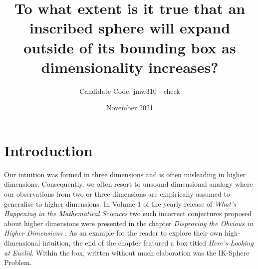 \title{To what extent is it true that an inscribed sphere will expand outside of its bounding box as dimensionality increases?}
\author{Candidate Code: jmw310 - check}
\date{November 2021}



\section{Introduction}
Our intuition was formed in three dimensions and is often misleading in higher dimensions. Consequently, we often resort to unsound dimensional analogy where our observations from two or three dimensions are empirically assumed to generalise to higher dimensions. In Volume 1 of the yearly release of \textit{What’s Happening in the Mathematical Sciences} two such incorrect conjectures proposed about higher dimensions were presented in the chapter \textit{Disproving the Obvious in Higher Dimensions} \cite{Cipra_1993}. As an example for the reader to explore their own high-dimensional intuition, the end of the chapter featured a box titled \textit{Here's Looking at Euclid}. Within the box, written without much elaboration was the IK-Sphere Problem. 

